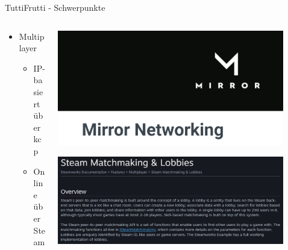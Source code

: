 \documentclass[xcolor=dvipsnames]{beamer}
\begin{document}
\begin{frame}{TuttiFrutti - Schwerpunkte}
\begin{columns}
\begin{column}{0.5\textwidth}
\begin{itemize}
	\item Multiplayer
	\begin{itemize}
		\item IP-basiert über kcp 
		\item Online über Steam
	\end{itemize}
\end{itemize}
\end{column}
\begin{column}{0.5\textwidth} 
	\begin{center}
		\includegraphics[width=0.9\textwidth]{Mirror.png}
	\end{center}
		\begin{center}
		\includegraphics[width=0.9\textwidth]{SteamWorks.png}
	\end{center}
\end{column}
\end{columns}
\end{frame}
\end{document}
